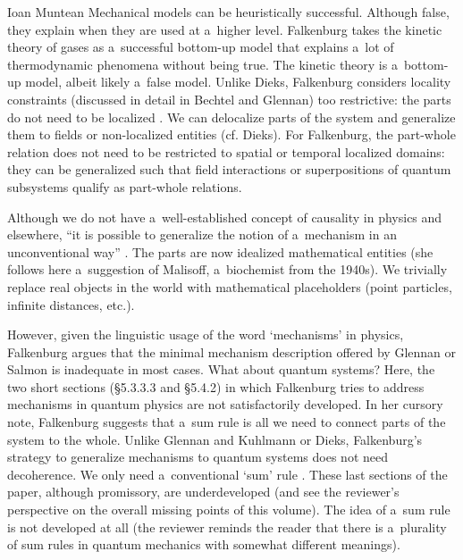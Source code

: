 \begin{recengenv}{Ioan Muntean}
Mechanical models can be heuristically successful. Although false, they explain when they are used at a~higher level. Falkenburg takes the kinetic theory of gases as a~successful bottom-up model that explains a~lot of thermodynamic phenomena without being true. The kinetic theory is a~bottom-up model, albeit likely a~false model. Unlike Dieks, Falkenburg considers locality constraints (discussed in detail in Bechtel and Glennan) too restrictive: the parts do not need to be localized
\parencite*[][p.81]{falkenburg_mechanistic_2019}. %
 We can delocalize parts of the system and generalize them to fields or non-localized entities (cf. Dieks). For Falkenburg, the part-whole relation does not need to be restricted to spatial or temporal localized domains: they can be generalized such that field interactions or superpositions of quantum subsystems qualify as part-whole relations.

Although we do not have a~well-established concept of causality in physics and elsewhere, ``it is possible to generalize the notion of a~mechanism in an unconventional way''
\parencite*[][p.82]{falkenburg_mechanistic_2019}. %
 The parts are now idealized mathematical entities (she follows here a~suggestion of Malisoff, a~biochemist from the 1940s). We trivially replace real objects in the world with mathematical placeholders (point particles, infinite distances, etc.).

However, given the linguistic usage of the word ‘mechanisms' in physics, Falkenburg argues that the minimal mechanism description offered by Glennan or Salmon is inadequate in most cases. What about quantum systems? Here, the two short sections (§5.3.3.3 and §5.4.2) in which Falkenburg tries to address mechanisms in quantum physics are not satisfactorily developed. In her cursory note, Falkenburg suggests that a~sum rule is all we need to connect parts of the system to the whole. Unlike Glennan and Kuhlmann or Dieks, Falkenburg's strategy to generalize mechanisms to quantum systems does not need decoherence. We only need a~conventional ‘sum' rule
\parencite*[][p.83]{falkenburg_mechanistic_2019}. %
 These last sections of the paper, although promissory, are underdeveloped (and see the reviewer's perspective on the overall missing points of this volume). The idea of a~sum rule is not developed at all (the reviewer reminds the reader that there is a~plurality of sum rules in quantum mechanics with somewhat different meanings).


\end{recengenv}
